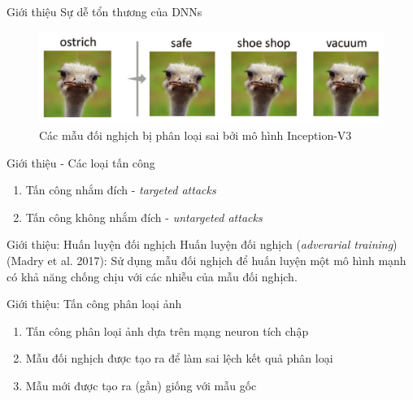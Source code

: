 \begin{frame}{Giới thiệu}
    Sự dễ tổn thương của DNNs
    \begin{figure}
    \centering
    \includegraphics[scale=0.2]{images/fig_01.png}
    \caption{Các mẫu đối nghịch bị phân loại sai
        bởi mô hình Inception-V3}
    \end{figure}
\end{frame}

\begin{frame}{Giới thiệu - Các loại tấn công}
    \begin{enumerate}
        \item Tấn công nhắm đích - \textit{targeted attacks}
        \item Tấn công không nhắm đích - \textit{untargeted attacks}
    \end{enumerate}
\end{frame}

\begin{frame}{Giới thiệu: Huấn luyện đối nghịch}
    Huấn luyện đối nghịch (\textit{adverarial training}) (Madry et al. 2017): Sử dụng mẫu đối nghịch để huấn luyện một mô hình mạnh có khả năng chống chịu với các nhiễu của mẫu đối nghịch.
\end{frame}

\begin{frame}{Giới thiệu: Tấn công phân loại ảnh}
    \begin{enumerate}
        \item Tấn công phân loại ảnh dựa trên mạng neuron tích chập
        \item Mẫu đối nghịch được tạo ra để làm sai lệch kết quả phân loại
        \item Mẫu mới được tạo ra (gần) giống với mẫu gốc
    \end{enumerate}
\end{frame}


